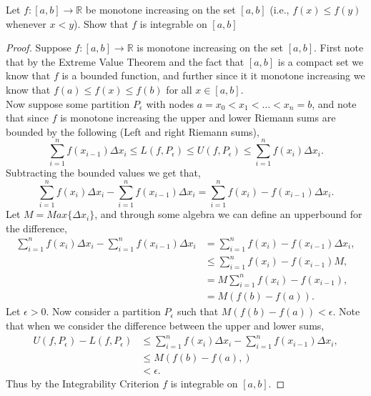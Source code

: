 \documentclass[12pt]{article}
\makeatletter
\theoremstyle{homework}
\newenvironment{exercise}[1]
{\def\@currentlabel{#1}\exercisecore}
{\endexercisecore}
\newcommand{\Reals}{\ensuremath{\mathbb R}}
\makeatother
\begin{document}
\begin{exercise}{Abbott 7.2.7} Let $f: [a,b] \to \Reals$ be monotone increasing on the set $[a,b]$ (i.e., $f(x) \le f(y)$ whenever $x < y$).
  Show that $f$ is integrable on $[a,b]$\\

  \begin{proof}
    Suppose $f: [a,b] \to \Reals$ is monotone increasing on the set $[a,b]$. First note that by the Extreme Value Theorem and the fact that $[a,b]$
    is a compact set we know that $f$ is a bounded function, and further since it it monotone increasing we know that $f(a) \le f(x) \le f(b)$ for all 
    $x \in [a,b]$.\\
    Now suppose some partition $P_\epsilon$ with nodes $a = x_0 < x_1 < \dots <x_n = b$, and note that since $f$ is monotone increasing the upper and lower Riemann sums are bounded by the following (Left and right Riemann sums),
    \begin{equation*}
      \sum_{i=1}^{n} f(x_{i - 1})\Delta x_i \leq L(f, P_\epsilon) \leq U(f, P_\epsilon) \leq \sum_{i=1}^{n} f(x_{i})\Delta x_i.
    \end{equation*}  
    Subtracting the bounded values we get that,
    \begin{equation*}
      \sum_{i=1}^{n} f(x_{i})\Delta x_i - \sum_{i=1}^{n} f(x_{i - 1})\Delta x_i = \sum_{i=1}^{n} f(x_{i}) - f(x_{i - 1})\Delta x_i.
    \end{equation*}  
    Let $M = Max\{\Delta x_i\}$, and through some algebra we can define an upperbound for the difference,
    \begin{align*}
      \sum_{i=1}^{n} f(x_{i})\Delta x_i - \sum_{i=1}^{n} f(x_{i - 1})\Delta x_i &= \sum_{i=1}^{n} f(x_{i}) - f(x_{i - 1})\Delta x_i,\\
      &\le \sum_{i=1}^{n} f(x_{i}) - f(x_{i - 1})M,\\
      &= M\sum_{i=1}^{n} f(x_{i}) - f(x_{i - 1}),\\
      &= M(f(b) - f(a)).
    \end{align*}
Let $\epsilon > 0$. Now consider a partition $P_{\epsilon}$ such that $M(f(b) - f(a)) < \epsilon$. Note that when we consider the difference between the upper and lower sums,
\begin{align*}
  U(f, P_\epsilon) - L(f, P_\epsilon) &\le \sum_{i=1}^{n} f(x_{i})\Delta x_i - \sum_{i=1}^{n} f(x_{i - 1})\Delta x_i,\\
   &\le M(f(b) - f(a),)\\
   &< \epsilon.
\end{align*}  
  Thus by the Integrability Criterion $f$ is integrable on $[a,b]$.
\end{proof}






\end{exercise}
\end{document}
